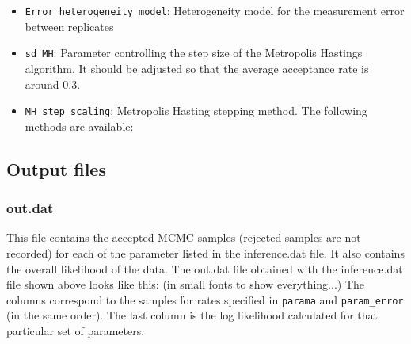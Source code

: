 \documentclass[]{article}   %
\begin{document}
\begin{itemize}
\begin{description}
 {\tt [7.75e-4,7.75e-5,4.0e-5,4.0e-6,4.0e-5,4.0e-6]} of {\tt [7.75e-4,4.0e-5,4.0e-5} for {\tt Homogeneous} rate model.
\end{description}
 \item {\tt{Error\_heterogeneity\_model}}:
 Heterogeneity model for the measurement error between replicates
 \item {\tt{sd\_MH}}:
Parameter controlling the step size of the Metropolis Hastings algorithm. It should be adjusted so that the average acceptance rate is around 0.3.
 \item {\tt{MH\_step\_scaling}}: Metropolis Hasting stepping method. The following methods are available:
 \end{itemize}


\subsection{Output files}

\subsubsection{out.dat}

This file contains the accepted MCMC samples (rejected samples are not recorded) for each of the parameter listed in the inference.dat file. It also contains the overall likelihood of the data. The out.dat file obtained with the inference.dat file shown above looks like this: (in small fonts to show everything...)
{\tiny }
The columns correspond to the samples for rates specified in {\tt parama} and {\tt param\_error} (in the same order). The last column is the log likelihood calculated for that particular set of parameters.
\end{document}
